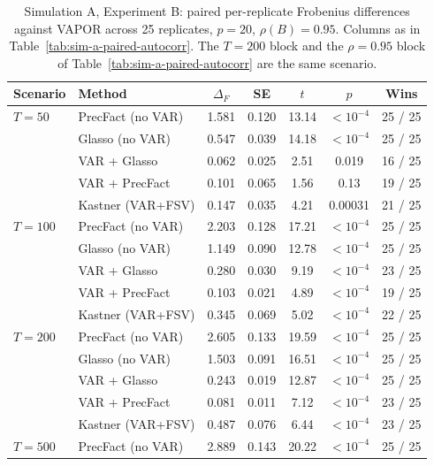 \begin{table}[h!]
\centering
\small
\caption{Simulation A, Experiment B: paired per-replicate Frobenius differences against VAPOR across 25 replicates, $p=20$, $\rho(B)=0.95$. Columns as in Table~\ref{tab:sim-a-paired-autocorr}. The $T = 200$ block and the $\rho = 0.95$ block of Table~\ref{tab:sim-a-paired-autocorr} are the same scenario.}
\label{tab:sim-a-paired-samplesize}
\begin{tabular}{llccccc}
\toprule
Scenario & Method & $\Delta_F$ & SE & $t$ & $p$ & Wins \\
\midrule
$T = 50$   & PrecFact (no VAR)  & 1.581 & 0.120 & 13.14 & $<10^{-4}$ & 25 / 25 \\
           & Glasso (no VAR)    & 0.547 & 0.039 & 14.18 & $<10^{-4}$ & 25 / 25 \\
           & VAR + Glasso       & 0.062 & 0.025 &  2.51 & 0.019      & 16 / 25 \\
           & VAR + PrecFact     & 0.101 & 0.065 &  1.56 & 0.13      & 19 / 25 \\
           & Kastner (VAR+FSV)  & 0.147 & 0.035 &  4.21 & 0.00031     & 21 / 25 \\
\midrule
$T = 100$  & PrecFact (no VAR)  & 2.203 & 0.128 & 17.21 & $<10^{-4}$ & 25 / 25 \\
           & Glasso (no VAR)    & 1.149 & 0.090 & 12.78 & $<10^{-4}$ & 25 / 25 \\
           & VAR + Glasso       & 0.280 & 0.030 &  9.19 & $<10^{-4}$ & 23 / 25 \\
           & VAR + PrecFact     & 0.103 & 0.021 &  4.89 & $<10^{-4}$ & 19 / 25 \\
           & Kastner (VAR+FSV)  & 0.345 & 0.069 &  5.02 & $<10^{-4}$ & 22 / 25 \\
\midrule
$T = 200$  & PrecFact (no VAR)  & 2.605 & 0.133 & 19.59 & $<10^{-4}$ & 25 / 25 \\
           & Glasso (no VAR)    & 1.503 & 0.091 & 16.51 & $<10^{-4}$ & 25 / 25 \\
           & VAR + Glasso       & 0.243 & 0.019 & 12.87 & $<10^{-4}$ & 25 / 25 \\
           & VAR + PrecFact     & 0.081 & 0.011 &  7.12 & $<10^{-4}$ & 23 / 25 \\
           & Kastner (VAR+FSV)  & 0.487 & 0.076 &  6.44 & $<10^{-4}$ & 23 / 25 \\
\midrule
$T = 500$  & PrecFact (no VAR)  & 2.889 & 0.143 & 20.22 & $<10^{-4}$ & 25 / 25 \\

\end{tabular}
\end{table}
